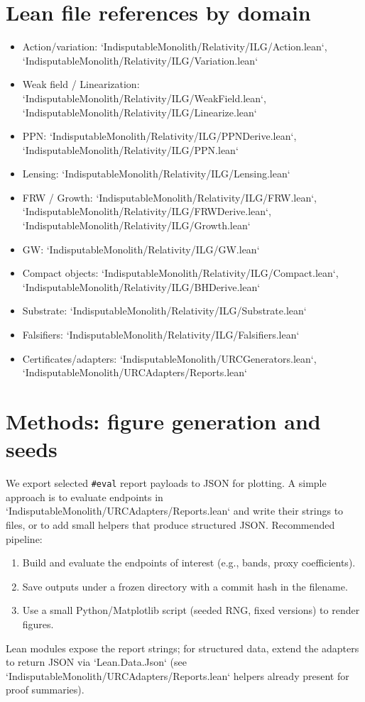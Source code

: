 \documentclass[11pt]{article}
\begin{document}
\section*{Lean file references by domain}
\begin{itemize}
  \item Action/variation: `IndisputableMonolith/Relativity/ILG/Action.lean`, `IndisputableMonolith/Relativity/ILG/Variation.lean`
  \item Weak field / Linearization: `IndisputableMonolith/Relativity/ILG/WeakField.lean`, `IndisputableMonolith/Relativity/ILG/Linearize.lean`
  \item PPN: `IndisputableMonolith/Relativity/ILG/PPNDerive.lean`, `IndisputableMonolith/Relativity/ILG/PPN.lean`
  \item Lensing: `IndisputableMonolith/Relativity/ILG/Lensing.lean`
  \item FRW / Growth: `IndisputableMonolith/Relativity/ILG/FRW.lean`, `IndisputableMonolith/Relativity/ILG/FRWDerive.lean`, `IndisputableMonolith/Relativity/ILG/Growth.lean`
  \item GW: `IndisputableMonolith/Relativity/ILG/GW.lean`
  \item Compact objects: `IndisputableMonolith/Relativity/ILG/Compact.lean`, `IndisputableMonolith/Relativity/ILG/BHDerive.lean`
  \item Substrate: `IndisputableMonolith/Relativity/ILG/Substrate.lean`
  \item Falsifiers: `IndisputableMonolith/Relativity/ILG/Falsifiers.lean`
  \item Certificates/adapters: `IndisputableMonolith/URCGenerators.lean`, `IndisputableMonolith/URCAdapters/Reports.lean`
\end{itemize}

\section{Methods: figure generation and seeds}
We export selected \texttt{\#eval} report payloads to JSON for plotting. A simple approach is to evaluate endpoints in `IndisputableMonolith/URCAdapters/Reports.lean` and write their strings to files, or to add small helpers that produce structured JSON. Recommended pipeline:
\begin{enumerate}
  \item Build and evaluate the endpoints of interest (e.g., bands, proxy coefficients).
  \item Save outputs under a frozen directory with a commit hash in the filename.
  \item Use a small Python/Matplotlib script (seeded RNG, fixed versions) to render figures.
\end{enumerate}
Lean modules expose the report strings; for structured data, extend the adapters to return JSON via `Lean.Data.Json` (see `IndisputableMonolith/URCAdapters/Reports.lean` helpers already present for proof summaries).
\end{document}
